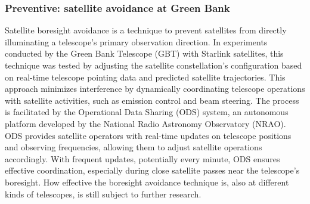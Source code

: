 
\subsubsection{Preventive: satellite avoidance at Green Bank}
\label{subsubsec:avoidance}
Satellite boresight avoidance is a technique to prevent satellites from directly illuminating a telescope's primary observation direction. In experiments conducted by the Green Bank Telescope (GBT) with Starlink satellites, this technique was tested \citep{nhan2024spectrumcoexistencedemonstrationeffectiveness} by adjusting the satellite constellation's configuration based on real-time telescope pointing data and predicted satellite trajectories. This approach minimizes interference by dynamically coordinating telescope operations with satellite activities, such as emission control and beam steering. The process is facilitated by the Operational Data Sharing (ODS) system, an autonomous platform developed by the National Radio Astronomy Observatory (NRAO). ODS provides satellite operators with real-time updates on telescope positions and observing frequencies, allowing them to adjust satellite operations accordingly. With frequent updates, potentially every minute, ODS ensures effective coordination, especially during close satellite passes near the telescope’s boresight. How effective the boresight avoidance technique is, also at different kinds of telescopes, is still subject to further research. 

